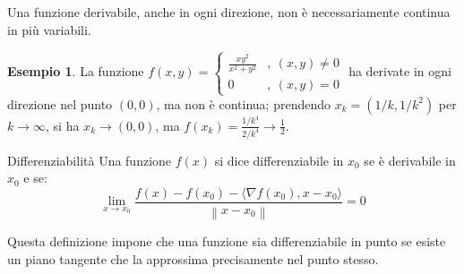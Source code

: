 \documentclass[10pt, a4paper]{scrartcl}
\theoremstyle{definition}
\newtheorem{esempio}{Esempio}
\numberwithin{esempio}{section}
\theoremstyle{definition}
\numberwithin{obs}{section}
\numberwithin{nota}{section}
\numberwithin{equation}{subsection}
\begin{document}
Una funzione derivabile, anche in ogni direzione, non \`e necessariamente continua in pi\`u variabili.
\begin{esempio}
	La funzione $f(x,y) = \begin{cases}
		\frac{xy^2}{x^2 + y^2}& , \ (x,y)\neq 0\\
		0 & , \ (x,y) =0 
	\end{cases}$ ha derivate in ogni direzione nel punto $(0,0)$, ma non \`e continua; prendendo $x_k = (1 / k , 1/k^2)$ per $k\to \infty$, si ha $x_k\to (0,0)$, ma $f(x_k) = \frac{1/k^4}{2 / k^4} \to \frac{1}{2}$.
\end{esempio}

\begin{definizione}{Differenziabilit\`a}{}
	Una funzione $f(x)$ si dice differenziabile in $x_0$ se \`e derivabile in $x_0 $ e se:
	\begin{equation}
		\lim_{x \to x_0} \frac{f(x) - f(x_0) - \langle \nabla f(x_0) , x -x_0 \rangle}{\left\lVert x - x_0 \right\rVert } = 0
	\end{equation}
\end{definizione}
\noindent Questa definizione impone che una funzione sia differenziabile in punto se esiste un piano tangente che la approssima precisamente nel punto stesso.
\end{document}
